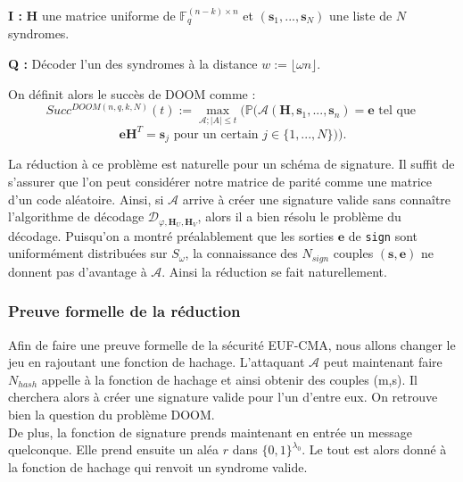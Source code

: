 \documentclass[12pt]{article}
\theoremstyle{plain}
\newcommand{\F}{\mathbb{F}}
\newcommand{\e}{\mathbf{e}}
\newcommand{\s}{\mathbf{s}}
\begin{document}
\leftskip=1cm
\noindent \textbf{I :} $\mathbf{H}$ une matrice uniforme de $\F_q^{(n-k)\times n}$ et $(\mathbf{s}_1,...,\mathbf{s}_N)$ une liste de $N$ syndromes. 

\noindent \textbf{Q :} Décoder l'un des syndromes à la distance $w := \lfloor \omega n \rfloor$. \\

\leftskip=0cm

\noindent On définit alors le succès de DOOM comme :
$$Succ^{DOOM(n,q,k,N)}(t) := \max_{\mathcal{A};|A|\leq t}(\mathbb{P}(\mathcal{A}(\mathbf{H},\mathbf{s}_1,...,\mathbf{s}_n)=\mathbf{e}\text{ tel que }$$
$$ \mathbf{eH}^T = \mathbf{s}_j \text{ pour un certain } j \in \{1,...,N\})).$$

\noindent La réduction à ce problème est naturelle pour un schéma de signature. Il suffit de s'assurer que l'on peut considérer notre matrice de parité comme une matrice d'un code aléatoire. Ainsi, si $\mathcal{A}$ arrive à créer une signature valide sans connaître l'algorithme de décodage $\mathcal{D}_{\varphi,\mathbf{H}_{U},\mathbf{H}_{V}}$, alors il a bien résolu le problème du décodage. Puisqu'on a montré préalablement que les sorties $\e$ de \verb|sign| sont uniformément distribuées sur $S_{\omega}$, la connaissance des $N_{sign}$ couples $(\s,\e)$ ne donnent pas d'avantage à $\mathcal{A}$. Ainsi la réduction se fait naturellement. \\


\subsubsection{Preuve formelle de la réduction}
Afin de faire une preuve formelle de la sécurité EUF-CMA, nous allons changer le jeu en rajoutant une fonction de hachage. L'attaquant $\mathcal{A}$ peut maintenant faire $N_{hash}$ appelle à la fonction de hachage et ainsi obtenir des couples (m,s). Il cherchera alors à créer une signature valide pour l'un d'entre eux. On retrouve bien la question du problème DOOM. \\
De plus, la fonction de signature prends maintenant en entrée un message quelconque. Elle prend ensuite un aléa $r$ dans $\{0,1\}^{\lambda_0}$. Le tout est alors donné à la fonction de hachage qui renvoit un syndrome valide. \\
\end{document}
